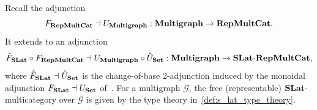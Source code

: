 \begin{theorem}

  Recall the adjunction 
  \[
  F_{\mathbf{RepMultCat}} \dashv U_{\mathbf{Multigraph}} : \mathbf{Multigraph} \to \mathbf{RepMultCat}.
  \]
  It extends to an adjunction
  \[
  \hat{F}_{\mathbf{SLat}} \circ F_{\mathbf{RepMultCat}} \dashv U_{\mathbf{Multigraph}} \circ \hat{U}_{\mathbf{Set}} : \mathbf{Multigraph} \to \mathbf{SLat}\text{-}\mathbf{RepMultCat},
  \]
  where $\hat{F}_{\mathbf{SLat}} \dashv \hat{U}_{\mathbf{Set}}$ is the change-of-base 2-adjunction induced by the monoidal adjunction $F_{\mathbf{SLat}} \dashv U_{\mathbf{Set}}$ of~.
  For a multigraph $\mathcal{G}$, the free (representable) $\mathbf{SLat}$-multicategory over $\mathcal{G}$ is given by the type theory in~\autoref{def:s_lat_type_theory}.
\end{theorem}
